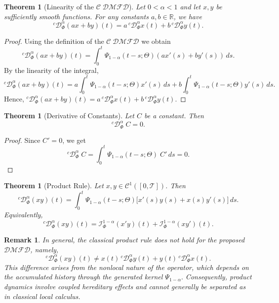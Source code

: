\documentclass[11pt]{article}
\numberwithin{equation}{section}
\newtheorem{theorem}[definition]{Theorem}
\newtheorem{remark}[definition]{Remark}
\begin{document}
\begin{theorem}[Linearity of the $\mathcal{C\;DMFD}$]
Let $0<\alpha<1$ and let $x,y$ be sufficiently smooth functions. For any constants $a,b\in\mathbb R$, we have
\[
{}^c\mathcal D_\Phi^\alpha(ax+by)(t)
=
a\,{}^c\mathcal D_\Phi^\alpha x(t)
+
b\,{}^c\mathcal D_\Phi^\alpha y(t).
\]
\label{326}
\end{theorem}

\begin{proof}
Using the definition of the  $\mathcal{C\;DMFD}$  we obtain
\[
{}^c\mathcal D_\Phi^\alpha(ax+by)(t)
=
\int_0^t
\Psi_{1-\alpha}(t-s;\Theta)
(ax'(s)+by'(s))\,ds.
\]
By the linearity of the integral,
\[
{}^c\mathcal D_\Phi^\alpha(ax+by)(t)
=
a\int_0^t
\Psi_{1-\alpha}(t-s;\Theta)x'(s)\,ds
+
b\int_0^t
\Psi_{1-\alpha}(t-s;\Theta)y'(s)\,ds.
\]
Hence,
\(
{}^c\mathcal D_\Phi^\alpha(ax+by)(t)
=
a\,{}^c\mathcal D_\Phi^\alpha x(t)
+
b\,{}^c\mathcal D_\Phi^\alpha y(t).
\)
\end{proof}


\begin{theorem}[Derivative of Constants]\label{327}
Let $C$ be a constant. Then
\[
{}^c\mathcal D_\Phi^\alpha\; C=0.
\]
\end{theorem}

\begin{proof}
Since $C'=0$, we get
\[
{}^c\mathcal D_\Phi^\alpha \; C
=
\int_0^t
\Psi_{1-\alpha}(t-s;\Theta)\;C'\,ds
=
0.
\]
\end{proof}


\begin{theorem}[Product Rule]
Let $x,y\in \mathcal{C}^1([0,\mathcal{T}])$. Then
\[
{}^c\mathcal D_\Phi^\alpha(xy)(t)
=
\int_0^t
\Psi_{1-\alpha}(t-s;\Theta)
\big[
x'(s)y(s)+x(s)y'(s)
\big]\,ds.
\]
Equivalently,
\[
{}^c\mathcal D_\Phi^\alpha(xy)(t)
=
\mathcal I_\Phi^{1-\alpha}(x'y)(t)
+
\mathcal I_\Phi^{1-\alpha}(xy')(t).
\]
\end{theorem}


\begin{remark}
In general, the classical product rule does not hold for the proposed
$\mathcal{DMFD}$, namely,
\[
{}^c \mathcal D_\Phi^\alpha(xy)(t)
\neq
x(t)\,{}^c \mathcal D_\Phi^\alpha y(t)
+
y(t)\,{}^c \mathcal D_\Phi^\alpha x(t).
\]
This difference arises from the nonlocal nature of the operator, which
depends on the accumulated history through the generated kernel
\(
\Psi_{1-\alpha}.
\)
Consequently, product dynamics involve coupled hereditary effects and
cannot generally be separated as in classical local calculus.
\end{remark}
\end{document}
